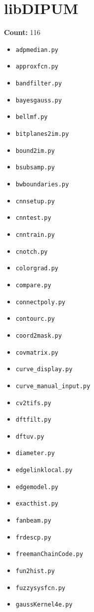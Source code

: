 \documentclass[11pt]{article}
\begin{document}
\section*{libDIPUM}
\textbf{Count:} 116
\begin{itemize}[leftmargin=1.5em]
\item \texttt{adpmedian.py}
\item \texttt{approxfcn.py}
\item \texttt{bandfilter.py}
\item \texttt{bayesgauss.py}
\item \texttt{bellmf.py}
\item \texttt{bitplanes2im.py}
\item \texttt{bound2im.py}
\item \texttt{bsubsamp.py}
\item \texttt{bwboundaries.py}
\item \texttt{cnnsetup.py}
\item \texttt{cnntest.py}
\item \texttt{cnntrain.py}
\item \texttt{cnotch.py}
\item \texttt{colorgrad.py}
\item \texttt{compare.py}
\item \texttt{connectpoly.py}
\item \texttt{contourc.py}
\item \texttt{coord2mask.py}
\item \texttt{covmatrix.py}
\item \texttt{curve\_display.py}
\item \texttt{curve\_manual\_input.py}
\item \texttt{cv2tifs.py}
\item \texttt{dftfilt.py}
\item \texttt{dftuv.py}
\item \texttt{diameter.py}
\item \texttt{edgelinklocal.py}
\item \texttt{edgemodel.py}
\item \texttt{exacthist.py}
\item \texttt{fanbeam.py}
\item \texttt{frdescp.py}
\item \texttt{freemanChainCode.py}
\item \texttt{fun2hist.py}
\item \texttt{fuzzysysfcn.py}
\item \texttt{gaussKernel4e.py}

\end{itemize}
\end{document}
